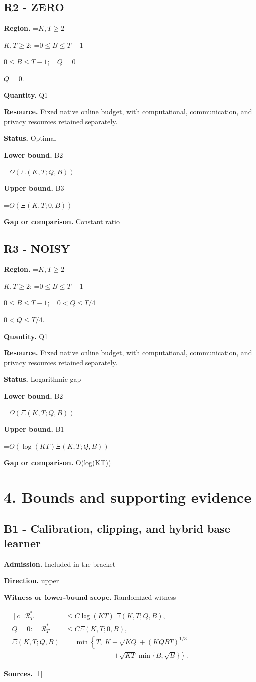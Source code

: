 \documentclass[10pt,a4paper]{article}
\newcommand{\AtlasMath}[1]{\par\begingroup\centering\setbox0=\hbox{$\displaystyle #1$}\ifdim\wd0>1.4\linewidth\typeout{ATLAS WIDE FORMULA: \the\wd0}\fi\ifdim\wd0>\linewidth\resizebox{\linewidth}{!}{\box0}\else\box0\fi\par\endgroup}
\newcommand{\AtlasInlineMath}[1]{\begingroup\setbox0=\hbox{$#1$}\ifdim\wd0>.4\linewidth\endgroup\AtlasMath{#1}\else\endgroup$#1$\fi}
\begin{document}
\subsection{R2 - ZERO}
\textbf{Region.} \AtlasInlineMath{K,T\ge 2}; \AtlasInlineMath{0\le B\le T-1}; \AtlasInlineMath{Q=0}.

\textbf{Quantity.} Q1

\textbf{Resource.} Fixed native online budget, with computational, communication, and privacy resources retained separately.

\textbf{Status.} Optimal

\textbf{Lower bound.} B2

\AtlasMath{\Omega(\Xi(K,T;Q,B))}
\textbf{Upper bound.} B3

\AtlasMath{O(\Xi(K,T;0,B))}
\textbf{Gap or comparison.} Constant ratio

\subsection{R3 - NOISY}
\textbf{Region.} \AtlasInlineMath{K,T\ge 2}; \AtlasInlineMath{0\le B\le T-1}; \AtlasInlineMath{0<Q\le T/4}.

\textbf{Quantity.} Q1

\textbf{Resource.} Fixed native online budget, with computational, communication, and privacy resources retained separately.

\textbf{Status.} Logarithmic gap

\textbf{Lower bound.} B2

\AtlasMath{\Omega(\Xi(K,T;Q,B))}
\textbf{Upper bound.} B1

\AtlasMath{O(\log(KT)\Xi(K,T;Q,B))}
\textbf{Gap or comparison.} O(log(KT))

\section{4. Bounds and supporting evidence}
\subsection{B1 - Calibration, clipping, and hybrid base learner}
\textbf{Admission.} Included in the bracket

\textbf{Direction.} upper

\textbf{Witness or lower-bound scope.} Randomized witness

\AtlasMath{\begin{aligned}[c]\mathcal{R}_T^*&\le C\log(KT)\,\Xi(K,T;Q,B),\\ Q=0:\quad\mathcal{R}_T^*&\le C\Xi(K,T;0,B),\\ \Xi(K,T;Q,B)&=\min\left\{T,\ K+\sqrt{KQ}+(KQBT)^{1/3}\right.\\ &\hspace{7em}\left.+\sqrt{KT}\min\{B,\sqrt B\}\right\}.\end{aligned}}
\textbf{Sources.} \href{https://arxiv.org/pdf/2610.26116}{[1]}
\end{document}
